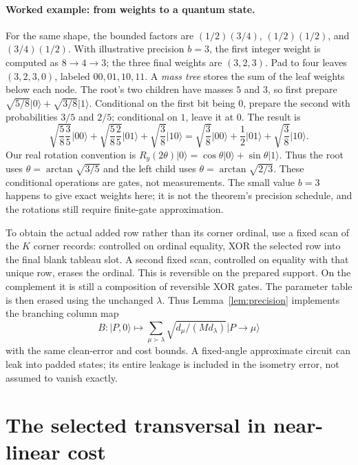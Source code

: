\documentclass[11pt]{article}
\theoremstyle{definition}
\newcommand{\ket}[1]{\lvert #1\rangle}
\DeclareMathOperator{\atan}{arctan}
\begin{document}
\paragraph{Worked example: from weights to a quantum state.}
For the same shape, the bounded factors are
$(1/2)(3/4)$, $(1/2)(1/2)$, and $(3/4)(1/2)$.
With illustrative precision $b=3$, the first integer weight is computed
as $8\to4\to3$; the three final weights are $(3,2,3)$.
Pad to four leaves $(3,2,3,0)$, labeled $00,01,10,11$.
A \emph{mass tree} stores the sum of the leaf weights below each node.
The root's two children have masses $5$ and $3$, so first prepare
$\sqrt{5/8}\ket0+\sqrt{3/8}\ket1$.
Conditional on the first bit being $0$, prepare the second with
probabilities $3/5$ and $2/5$; conditional on $1$, leave it at $0$.
The result is
\[
 \sqrt{\frac58\frac35}\ket{00}
 +\sqrt{\frac58\frac25}\ket{01}
 +\sqrt{\frac38}\ket{10}
 =\sqrt{\frac38}\ket{00}+\frac12\ket{01}
 +\sqrt{\frac38}\ket{10}.
\]
Our real rotation convention is
$R_y(2\theta)\ket0=\cos\theta\ket0+\sin\theta\ket1$.
Thus the root uses $\theta=\atan\sqrt{3/5}$ and the left child uses
$\theta=\atan\sqrt{2/3}$. These conditional operations are gates, not
measurements. The small value $b=3$ happens to give exact weights here;
it is not the theorem's precision schedule, and the rotations still
require finite-gate approximation.

To obtain the actual added row rather than its corner ordinal, use a fixed
scan of the $K$ corner records: controlled on ordinal equality, XOR the
selected row into the final blank tableau slot. A second fixed scan,
controlled on equality with that unique row, erases the ordinal. This is
reversible on the prepared support. On the complement it is still a
composition of reversible XOR gates. The parameter table is then erased
using the unchanged $\lambda$. Thus Lemma~\ref{lem:precision} implements
the branching column map
\begin{equation}\label{eq:B}
 B:\ket{P,0}\longmapsto
 \sum_{\mu\succ\lambda}\sqrt{d_\mu/(M d_\lambda)}\ket{P\to\mu}
\end{equation}
with the same clean-error and cost bounds. A fixed-angle approximate
circuit can leak into padded states; its entire leakage is included in the
isometry error, not assumed to vanish exactly.

\section{The selected transversal in near-linear cost}\label{sec:generators}
\end{document}

